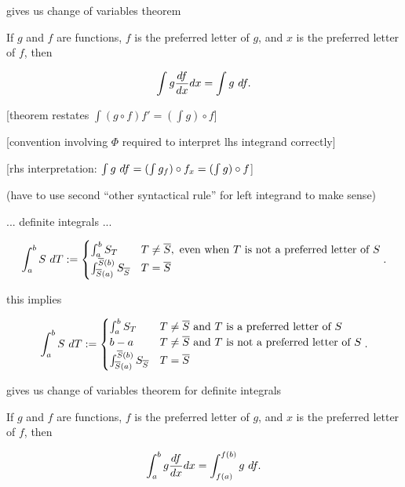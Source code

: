 \documentclass{article}
\begin{document}
gives us change of variables theorem

\begin{mdframed}
    If $g$ and $f$ are functions, $f$ is the preferred letter of $g$, and $x$ is the preferred letter of $f$, then
       
    \begin{align*}
        \int g \frac{df}{dx} dx = \int g \text{ } df.
    \end{align*}
    
    [theorem restates $\int (g \circ f) f' = (\int g) \circ f$]
    
    [convention involving $\Phi$ required to interpret lhs integrand correctly]
    
    [rhs interpretation: $\int g \text{ } df = (\int g_f) \circ f_x = (\int g) \circ f$]
\end{mdframed}

(have to use second ``other syntactical rule'' for left integrand to make sense)

... definite integrals ...

\begin{align*}
    \int_a^b S \text{ } dT :=
    \begin{cases}
        \int_a^b S_T & T \neq \overline{S}, \text{ even when $T$ is not a preferred letter of $S$} \\
        \int_{\overline{S}(a)}^{\overline{S}(b)} S_{\overline{S}} & T = \overline{S}
    \end{cases}.
\end{align*}

this implies

\begin{align*}
    \int_a^b S \text{ } dT :=
    \begin{cases}
        \int_a^b S_T & T \neq \overline{S} \text{ and $T$ is a preferred letter of $S$} \\
        b - a & T \neq \overline{S} \text{ and $T$ is not a preferred letter of $S$} \\
        \int_{\overline{S}(a)}^{\overline{S}(b)} S_{\overline{S}} & T = \overline{S}
    \end{cases}.
\end{align*}

gives us change of variables theorem for definite integrals

\begin{mdframed}
    If $g$ and $f$ are functions, $f$ is the preferred letter of $g$, and $x$ is the preferred letter of $f$, then
        
    \begin{align*}
        \int_a^b g \frac{df}{dx} dx = \int_{f(a)}^{f(b)} g \text{ } df.
    \end{align*}
\end{mdframed}
\end{document}
